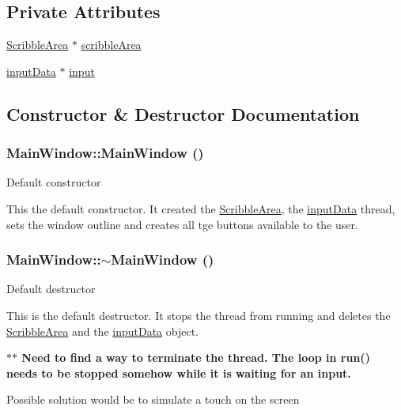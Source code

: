 \subsection*{Private Attributes}
\begin{DoxyCompactItemize}
\item 
\hyperlink{classScribbleArea}{ScribbleArea} $\ast$ \hyperlink{classMainWindow_a2a7ec082e8fbb0d6603f7ecef46ec13e}{scribbleArea}
\item 
\hyperlink{classinputData}{inputData} $\ast$ \hyperlink{classMainWindow_a5d71f98f9f6b23c05835a8aa22dd0ac3}{input}
\end{DoxyCompactItemize}


\subsection{Constructor \& Destructor Documentation}
\hypertarget{classMainWindow_a34c4b4207b46d11a4100c9b19f0e81bb}{
\subsubsection[{MainWindow}]{\setlength{\rightskip}{0pt plus 5cm}MainWindow::MainWindow ()}}
\label{classMainWindow_a34c4b4207b46d11a4100c9b19f0e81bb}
Default constructor

This the default constructor. It created the \hyperlink{classScribbleArea}{ScribbleArea}, the \hyperlink{classinputData}{inputData} thread, sets the window outline and creates all tge buttons available to the user. \hypertarget{classMainWindow_ae98d00a93bc118200eeef9f9bba1dba7}{
\subsubsection[{$\sim$MainWindow}]{\setlength{\rightskip}{0pt plus 5cm}MainWindow::$\sim$MainWindow ()}}
\label{classMainWindow_ae98d00a93bc118200eeef9f9bba1dba7}
Default destructor

This is the default destructor. It stops the thread from running and deletes the \hyperlink{classScribbleArea}{ScribbleArea} and the \hyperlink{classinputData}{inputData} object.

{\bfseries $\ast$$\ast$ Need to find a way to terminate the thread. The loop in run() needs to be stopped somehow while it is waiting for an input.}
\begin{DoxyItemize}
\item Possible solution would be to simulate a touch on the screen 
\end{DoxyItemize}

